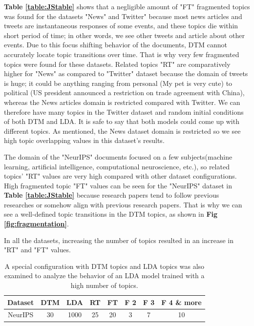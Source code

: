 \textbf{Table \ref{table:JStable}} shows that a negligible amount of "FT" fragmented topics was found for the datasets "News" and Twitter" because most news articles and tweets are instantaneous responses of some events, and these topics die within short period of time; in other words, we see other tweets and article about other events. Due to this focus shifting behavior of the documents, DTM cannot accurately locate topic transitions over time. That is why very few fragmented topics were found for these datasets. Related topics "RT" are comparatively higher for "News" as compared to "Twitter" dataset because the domain of tweets is huge; it could be anything ranging from personal (My pet is very cute) to political (US president announced a restriction on trade agreement with China), whereas the News articles domain is restricted compared with Twitter. We can therefore have many topics in the Twitter dataset and random initial conditions of both DTM and LDA. It is safe to say that both models could come up with different topics. As mentioned,  the News dataset domain is restricted so we see high topic overlapping values in this dataset's results.

The domain of the "NeurIPS" documents focused on a few subjects(machine learning, artificial intelligence, computational neuroscience, etc.), so related topics' "RT" values are very high compared with other dataset configurations. High fragmented topic "FT" values can be seen for the "NeurIPS" dataset in \textbf{Table \ref{table:JStable}} because research papers tend to follow previous researches or somehow align with previous research papers. That is why we can see a well-defined topic transitions in the DTM topics, as shown in \textbf{Fig \ref{fig:fragmentation}}.

In all the datasets, increasing the number of topics resulted in an increase in "RT" and "FT" values.

\begin{table}[h!]
\begin{center}
\begin{tabular}{|c|c|c|c|c|c|c|c|}
\hline \textbf{Dataset} & \textbf{DTM} & \textbf{LDA} & \textbf{RT}& \textbf{FT} & \textbf{F 2} & \textbf{F 3} & \textbf{F 4 \& more} \\ \hline

NeurIPS & 30 & 1000 & 25 & 20 & 3 & 7 & 10 \\ \hline

\end{tabular}
\caption{A special configuration with DTM topics and LDA topics was also examined to analyze the behavior of an LDA model trained with a high number of topics.}
\label{table:JS30DTM1000LDA}
\end{center}
\end{table}

